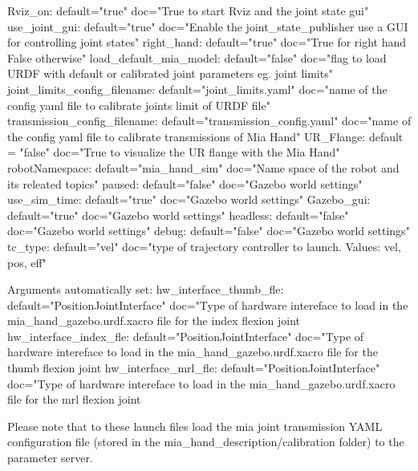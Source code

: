 \begin{DoxyVerb} Rviz_on:                          default="true"                      doc="True to start Rviz and the joint state gui"
 use_joint_gui:                    default="true"                      doc="Enable the joint_state_publisher use a GUI for controlling joint states"
 right_hand:                       default="true"                      doc="True for right hand False otherwise"
 load_default_mia_model:           default="false"                     doc="flag to load URDF with default or calibrated joint parameters eg. joint limits"
 joint_limits_config_filename:     default="joint_limits.yaml"         doc="name of the config yaml file to calibrate joints limit of URDF file"
 transmission_config_filename:     default="transmission_config.yaml"  doc="name of the config yaml file to calibrate transmissions of Mia Hand"
 UR_Flange:                        default = "false"                   doc="True to visualize the UR flange with the Mia Hand"
 robotNamespace:                   default="mia_hand_sim"              doc="Name space of the robot and its releated topics"
 paused:                           default="false"                     doc="Gazebo world settings"
 use_sim_time:                     default="true"                      doc="Gazebo world settings"
 Gazebo_gui:                       default="true"                      doc="Gazebo world settings"
 headless:                         default="false"                     doc="Gazebo world settings"
 debug:                            default="false"                     doc="Gazebo world settings"
 tc_type:                          default="vel"                       doc="type of trajectory controller to launch. Values: vel, pos, eff"

 Arguments automatically set:
 hw_interface_thumb_fle:           default="PositionJointInterface"    doc="Type of hardware intereface to load in the mia_hand_gazebo.urdf.xacro file for the index flexion joint
 hw_interface_index_fle:           default="PositionJointInterface"    doc="Type of hardware intereface to load in the mia_hand_gazebo.urdf.xacro file for the thumb flexion joint
 hw_interface_mrl_fle:             default="PositionJointInterface"    doc="Type of hardware intereface to load in the mia_hand_gazebo.urdf.xacro file for the mrl flexion joint
\end{DoxyVerb}


Please note that to these launch files load the mia joint transmission Y\+A\+ML configuration file (stored in the mia\+\_\+hand\+\_\+description/calibration folder) to the parameter server. 